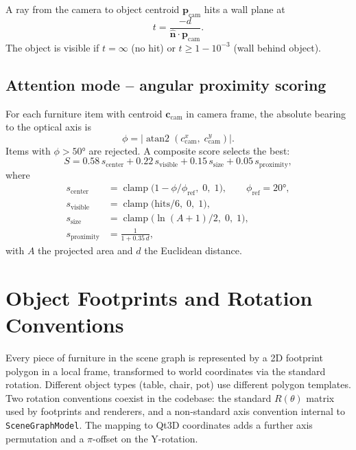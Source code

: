 \documentclass[a4paper, 11pt]{article}
\DeclareMathOperator{\atantwo}{atan2}
\newcommand{\vect}[1]{\bm{#1}}
\begin{document}
A ray from the camera to object centroid $\vect{p}_{\text{cam}}$ hits a
wall plane at
\begin{equation}
  t = \frac{-d}{\hat{\vect{n}} \cdot \vect{p}_{\text{cam}}}.
\end{equation}
The object is visible if $t = \infty$ (no hit) or $t \geq 1 - 10^{-3}$
(wall behind object).

\subsection{Attention mode -- angular proximity scoring}\label{sec:attention}

For each furniture item with centroid $\vect{c}_{\text{cam}}$ in camera
frame, the absolute bearing to the optical axis is
\begin{equation}
  \phi = \bigl|\atantwo(c_{\text{cam}}^x,\; c_{\text{cam}}^y)\bigr|.
\end{equation}
Items with $\phi > 50°$ are rejected.  A composite score selects the best:
\begin{equation}\label{eq:attention-score}
  S = 0.58\,s_{\text{center}}
    + 0.22\,s_{\text{visible}}
    + 0.15\,s_{\text{size}}
    + 0.05\,s_{\text{proximity}},
\end{equation}
where
\begin{align}
  s_{\text{center}}
    &= \operatorname{clamp}\!\bigl(1 - \phi / \phi_{\text{ref}},\; 0,\; 1\bigr),
      \qquad \phi_{\text{ref}} = 20°, \\
  s_{\text{visible}}
    &= \operatorname{clamp}\!\bigl(\text{hits}/6,\; 0,\; 1\bigr), \\
  s_{\text{size}}
    &= \operatorname{clamp}\!\bigl(\ln(A+1)/2,\; 0,\; 1\bigr), \\
  s_{\text{proximity}}
    &= \frac{1}{1 + 0.35\,d},
\end{align}
with $A$ the projected area and $d$ the Euclidean distance.

\section{Object Footprints and Rotation Conventions}\label{sec:footprints}

Every piece of furniture in the scene graph is represented by a 2D
footprint polygon in a local frame, transformed to world coordinates
via the standard rotation.  Different object types (table, chair, pot)
use different polygon templates.  Two rotation conventions coexist in
the codebase: the standard $R(\theta)$ matrix used by footprints and
renderers, and a non-standard axis convention internal to
\texttt{SceneGraphModel}.  The mapping to Qt3D coordinates adds a
further axis permutation and a $\pi$-offset on the Y-rotation.
\end{document}
